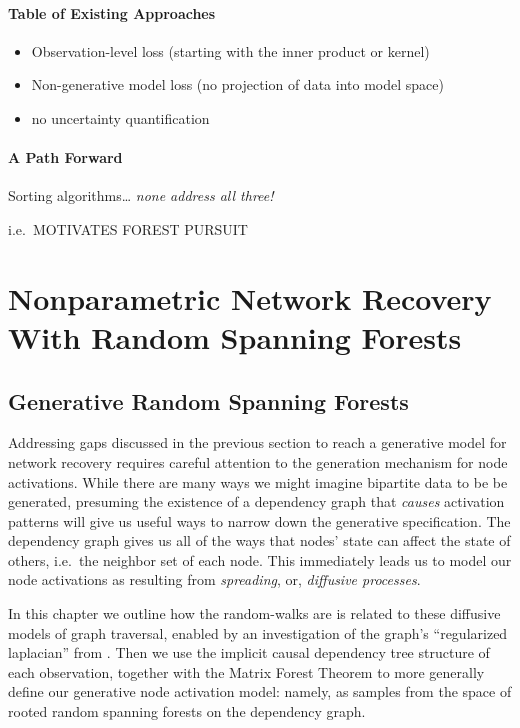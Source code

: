 \documentclass[%
	12pt,
		oneside,
		letterpaper
]{book}
\providecommand{\tightlist}{%
  \setlength{\itemsep}{0pt}\setlength{\parskip}{0pt}}\usepackage{longtable,booktabs,array}
\begin{document}
\subsection{Table of Existing
Approaches}\label{table-of-existing-approaches}

\begin{itemize}
\tightlist
\item
  Observation-level loss (starting with the inner product or kernel)
\item
  Non-generative model loss (no projection of data into model space)
\item
  no uncertainty quantification
\end{itemize}

\subsection{A Path Forward}\label{a-path-forward}

Sorting algorithms\ldots{} \emph{none address all three!}

i.e.~MOTIVATES FOREST PURSUIT

\part{Nonparametric Network Recovery With Random Spanning Forests}

\chapter{Generative Random Spanning
Forests}\label{generative-random-spanning-forests}

Addressing gaps discussed in the previous section to reach a generative
model for network recovery requires careful attention to the generation
mechanism for node activations. While there are many ways we might
imagine bipartite data to be be generated, presuming the existence of a
dependency graph that \emph{causes} activation patterns will give us
useful ways to narrow down the generative specification. The dependency
graph gives us all of the ways that nodes' state can affect the state of
others, i.e.~the neighbor set of each node. This immediately leads us to
model our node activations as resulting from \emph{spreading}, or,
\emph{diffusive processes}.

In this chapter we outline how the random-walks are is related to these
diffusive models of graph traversal, enabled by an investigation of the
graph's ``regularized laplacian'' from
\textcite{Semisupervisedlearning_Avrachenkov2017}. Then we use the
implicit causal dependency tree structure of each observation, together
with the Matrix Forest Theorem
\autocite{MatrixForestTheorem_Chebotarev2006,Countingrootedforests_Knill2013}
to more generally define our generative node activation model: namely,
as samples from the space of rooted random spanning forests on the
dependency graph.
\end{document}
